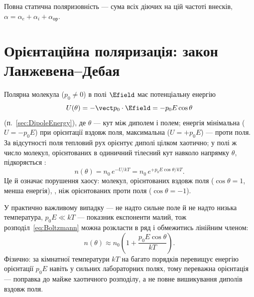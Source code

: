 Повна статична поляризовність --- сума всіх діючих на цій частоті внесків, $\alpha = \alpha_e + \alpha_i + \alpha_\text{ор}$.


\section{Орієнтаційна поляризація: закон Ланжевена--Дебая}\label{sec:Langevin-Debye}

Полярна молекула ($p_0\neq0$) в полі $\Efield$ має потенціальну енергію
\begin{equation*}
	U(\theta) = -\vect p_0\cdot\Efield = -p_0 E\cos\theta
\end{equation*}
(п.~\ref{sec:DipoleEnergy}), де $\theta$ --- кут між диполем і полем; енергія мінімальна ($U=-p_0E$) при орієнтації вздовж поля, максимальна
($U=+p_0E$) --- проти поля. За відсутності поля тепловий рух орієнтує диполі цілком хаотично; у полі ж число молекул, орієнтованих в одиничний
тілесний кут навколо напрямку $\theta$, підкоряється :
\begin{equation}\label{eq:Boltzmann}
	n(\theta) = n_0\, e^{-U/kT} = n_0\, e^{+p_0 E\cos\theta / kT}.
\end{equation}
Це й означає порушення хаосу: молекул, орієнтованих вздовж поля ($\cos\theta=1$, менша енергія), , ніж орієнтованих
проти поля ($\cos\theta=-1$).

У практично важливому випадку --- не надто сильне поле й не надто низька температура, $p_0E \ll kT$ --- показник експоненти малий, тож
розподіл~\eqref{eq:Boltzmann} можна розкласти в ряд і обмежитись лінійним членом:
\begin{equation}\label{eq:BoltzmannLinear}
	n(\theta) \approx n_0\left(1 + \frac{p_0 E \cos\theta}{kT}\right).
\end{equation}
Фізично: за кімнатної температури $kT$ на багато порядків перевищує енергію орієнтації $p_0E$ навіть у сильних лабораторних полях, тому переважна
орієнтація ---  поправка до майже хаотичного розподілу, а не повне вишикування диполів вздовж поля.

